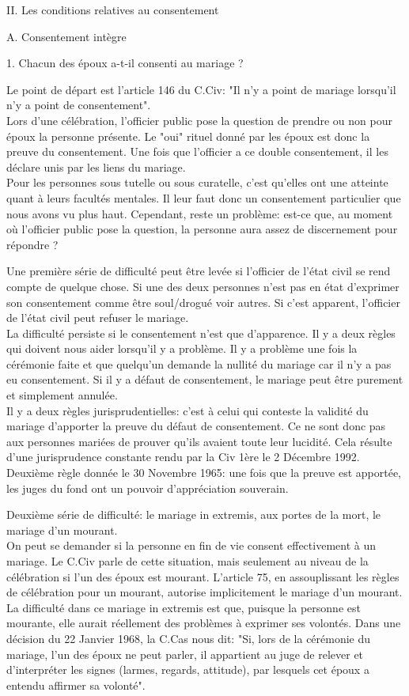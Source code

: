 \documentclass[12pt, a4paper, openany]{book}
\begin{document}
II. Les conditions relatives au consentement


A. Consentement intègre


1. Chacun des époux a-t-il consenti au mariage ?


Le point de départ est l'article 146 du C.Civ: "Il n'y a point de mariage lorsqu'il n'y a point de consentement". \\
Lors d'une célébration, l'officier public pose la question de prendre ou non pour époux la personne présente. Le "oui" rituel donné par les époux est donc la preuve du consentement. Une fois que l'officier a ce double consentement, il les déclare unis par les liens du mariage. \\
Pour les personnes sous tutelle ou sous curatelle, c'est qu'elles ont une atteinte quant à leurs facultés mentales. Il leur faut donc un consentement particulier que nous avons vu plus haut. Cependant, reste un problème: est-ce que, au moment où l'officier public pose la question, la personne aura assez de discernement pour répondre ? 


Une première série de difficulté peut être levée si l'officier de l'état civil se rend compte de quelque chose. Si une des deux personnes n'est pas en état d'exprimer son consentement comme être soul/drogué voir autres. Si c'est apparent, l'officier de l'état civil peut refuser le mariage. \\
La difficulté persiste si le consentement n'est que d'apparence. Il y a deux règles qui doivent nous aider lorsqu'il y a problème. Il y a problème une fois la cérémonie faite et que quelqu'un demande la nullité du mariage car il n'y a pas eu consentement. Si il y a défaut de consentement, le mariage peut être purement et simplement annulée. \\
Il y a deux règles jurisprudentielles: c'est à celui qui conteste la validité du mariage d'apporter la preuve du défaut de consentement. Ce ne sont donc pas aux personnes mariées de prouver qu'ils avaient toute leur lucidité. Cela résulte d'une jurisprudence constante rendu par la Civ 1ère le 2 Décembre 1992. Deuxième règle donnée le 30 Novembre 1965: une fois que la preuve est apportée, les juges du fond ont un pouvoir d'appréciation souverain.


Deuxième série de difficulté: le mariage in extremis, aux portes de la mort, le mariage d'un mourant. \\
On peut se demander si la personne en fin de vie consent effectivement à un mariage. Le C.Civ parle de cette situation, mais seulement au niveau de la célébration si l'un des époux est mourant. L'article 75, en assouplissant les règles de célébration pour un mourant, autorise implicitement le mariage d'un mourant. \\
La difficulté dans ce mariage in extremis est que, puisque la personne est mourante, elle aurait réellement des problèmes à exprimer ses volontés. Dans une décision du 22 Janvier 1968, la C.Cas nous dit: "Si, lors de la cérémonie du mariage, l'un des époux ne peut parler, il appartient au juge de relever et d'interpréter les signes (larmes, regards, attitude), par lesquels cet époux a entendu affirmer sa volonté". 
\end{document}
